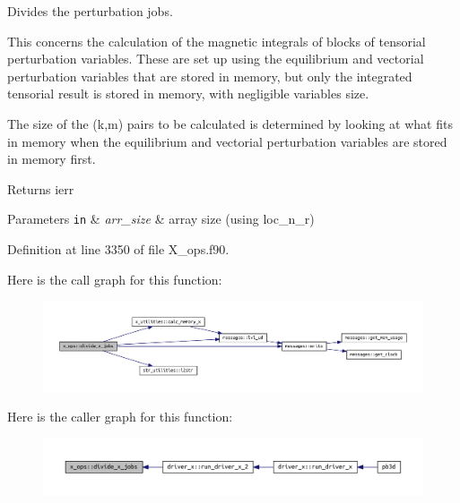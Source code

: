 Divides the perturbation jobs. 

This concerns the calculation of the magnetic integrals of blocks of tensorial perturbation variables. These are set up using the equilibrium and vectorial perturbation variables that are stored in memory, but only the integrated tensorial result is stored in memory, with negligible variables size.

The size of the (k,m) pairs to be calculated is determined by looking at what fits in memory when the equilibrium and vectorial perturbation variables are stored in memory first.

\begin{DoxyReturn}{Returns}
ierr
\end{DoxyReturn}

\begin{DoxyParams}[1]{Parameters}
\mbox{\tt in}  & {\em arr\+\_\+size} & array size (using loc\+\_\+n\+\_\+r) \\
\hline
\end{DoxyParams}


Definition at line 3350 of file X\+\_\+ops.\+f90.

Here is the call graph for this function\+:\nopagebreak
\begin{figure}[H]
\begin{center}
\leavevmode
\includegraphics[width=350pt]{namespacex__ops_a677c88d85fe1bfbf3579a2421ce16f2f_cgraph}
\end{center}
\end{figure}
Here is the caller graph for this function\+:\nopagebreak
\begin{figure}[H]
\begin{center}
\leavevmode
\includegraphics[width=350pt]{namespacex__ops_a677c88d85fe1bfbf3579a2421ce16f2f_icgraph}
\end{center}
\end{figure}
\mbox{\label{namespacex__ops_a73a80c582379669f8e07b09dd7456878}} 

